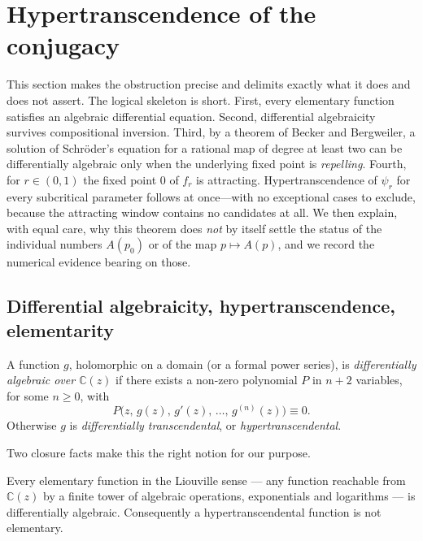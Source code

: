 \section{Hypertranscendence of the conjugacy}
\label{a:sec:ht}
This section makes the obstruction precise and delimits exactly what it does and does not assert. The logical skeleton is short. First, every elementary function satisfies an algebraic differential equation. Second, differential algebraicity survives compositional inversion. Third, by a theorem of Becker and Bergweiler, a solution of Schr\"oder's equation for a rational map of degree at least two can be differentially algebraic only when the underlying fixed point is \emph{repelling}. Fourth, for $r\in(0,1)$ the fixed point $0$ of $f_r$ is attracting. Hypertranscendence of $\psi_r$ for every subcritical parameter follows at once---with no exceptional cases to exclude, because the attracting window contains no candidates at all. We then explain, with equal care, why this theorem does \emph{not} by itself settle the status of the individual numbers $A(p_0)$ or of the map $p\mapsto A(p)$, and we record the numerical evidence bearing on those.

\subsection{Differential algebraicity, hypertranscendence, elementarity}

\begin{definition}
\label{a:def:da}
A function $g$, holomorphic on a domain (or a formal power series), is \emph{differentially algebraic over $\mathbb{C}(z)$} if there exists a non-zero polynomial $P$ in $n+2$ variables, for some $n\ge0$, with
\[
P\bigl(z,\,g(z),\,g'(z),\,\dots,\,g^{(n)}(z)\bigr)\equiv 0 .
\]
Otherwise $g$ is \emph{differentially transcendental}, or \emph{hypertranscendental}.
\end{definition}

Two closure facts make this the right notion for our purpose.

\begin{lemma}
\label{a:lem:elem-da}
Every elementary function in the Liouville sense --- any function reachable from $\mathbb{C}(z)$ by a finite tower of algebraic operations, exponentials and logarithms --- is differentially algebraic. Consequently a hypertranscendental function is not elementary.
\end{lemma}

